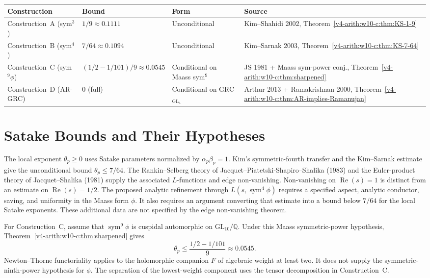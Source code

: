 \begin{center}
\small
\begin{tabular}{p{}|p{}|p{}|p{}}
Construction & Bound & Form & Source \\
\hline
Construction~A (sym\(^{3}\)) & \(1/9\approx 0.1111\) & Unconditional &
Kim--Shahidi 2002, Theorem~\ref{v4-arith:w10-c:thm:KS-1-9} \\
Construction~B (sym\(^{4}\)) & \(7/64\approx 0.1094\) & Unconditional &
Kim--Sarnak 2003, Theorem~\ref{v4-arith:w10-c:thm:KS-7-64} \\
Construction~C (sym\(^{9}\phi\)) & \((1/2-1/101)/9\approx 0.0545\) &
Conditional on Maass sym\(^{9}\) &
JS 1981 + Maass sym-power conj.,
Theorem~\ref{v4-arith:w10-c:thm:sharpened} \\
Construction~D (AR-GRC) & \(0\) (full) & Conditional on GRC\(_{\mathrm{GL}_4}\) &
Arthur 2013 + Ramakrishnan 2000,
Theorem~\ref{v4-arith:w10-c:thm:AR-implies-Ramanujan} \\
\end{tabular}
\end{center}

\section{Satake Bounds and Their Hypotheses}
\label{v4-arith:w10-c:seven-obstruction}

The local exponent \(\theta_p\geq0\) uses Satake parameters normalized
by \(\alpha_p\beta_p=1\). Kim's symmetric-fourth transfer and the
Kim--Sarnak estimate give the unconditional bound \(\theta_p\leq7/64\).
The Rankin--Selberg theory of Jacquet--Piatetski-Shapiro--Shalika
(1983) and the Euler-product theory of Jacquet--Shalika (1981)
supply the associated \(L\)-functions and edge non-vanishing.
Non-vanishing on \(\operatorname{Re}(s)=1\) is distinct from an
estimate on \(\operatorname{Re}(s)=1/2\).
The proposed analytic refinement through
\(L(s,\operatorname{sym}^{4}\phi)\) requires a specified aspect,
analytic conductor, saving, and uniformity in the Maass form
\(\phi\). It also requires an argument converting that estimate
into a bound below \(7/64\) for the local Satake exponents.
These additional data are not specified by the edge non-vanishing theorem.

For Construction~C, assume that \(\operatorname{sym}^{9}\phi\)
is cuspidal automorphic on \(\mathrm{GL}_{10}/\mathbb Q\).
Under this Maass symmetric-power hypothesis,
Theorem~\ref{v4-arith:w10-c:thm:sharpened} gives
\[
\theta_p\leq\frac{1/2-1/101}{9}\approx0.0545.
\]
Newton--Thorne functoriality applies to the holomorphic companion
\(F\) of algebraic weight at least two. It does not supply the
symmetric-ninth-power hypothesis for \(\phi\).
The separation of the lowest-weight component uses the tensor
decomposition in Construction~C.

